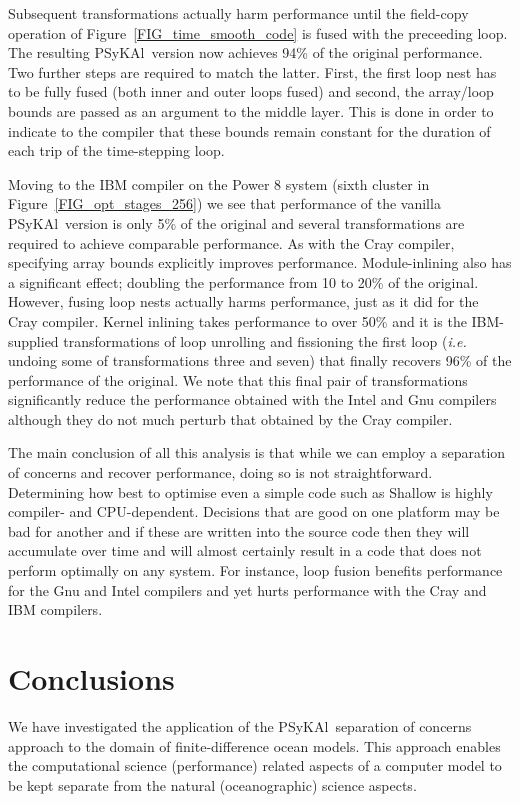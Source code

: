\documentclass{IOS-Book-Article}
\newcommand{\psykal}{{PS}y{KA}l\ }
\begin{document}
Subsequent transformations actually harm performance until the
field-copy operation of Figure~\ref{FIG_time_smooth_code} is fused
with the preceeding loop. The resulting \psykal version now achieves
94\% of the original performance. Two further steps are required to
match the latter. First, the first loop nest has to be fully fused
(both inner and outer loops fused) and second, the array/loop bounds
are passed as an argument to the middle layer. This is done in order
to indicate to the compiler that these bounds remain constant for the
duration of each trip of the time-stepping loop.

Moving to the IBM compiler on the Power 8 system (sixth cluster in
Figure~\ref{FIG_opt_stages_256}) we see that performance of the
vanilla \psykal version is only 5\% of the original and several
transformations are required to achieve comparable performance. As
with the Cray compiler, specifying array bounds explicitly improves
performance. Module-inlining also has a significant effect; doubling
the performance from 10 to 20\% of the original. However, fusing loop
nests actually harms performance, just as it did for the Cray
compiler. Kernel inlining takes performance to over 50\% and it is the
IBM-supplied transformations of loop unrolling and fissioning the
first loop ({\it i.e.} undoing some of transformations three and
seven) that finally recovers 96\% of the performance of the
original. We note that this final pair of transformations significantly
reduce the performance obtained with the Intel and Gnu compilers
although they do not much perturb that obtained by the Cray
compiler.

The main conclusion of all this analysis is that while we can employ a
separation of concerns and recover performance, doing so is not
straightforward. Determining how best to optimise even a simple code
such as Shallow is highly compiler- and CPU-dependent. Decisions that
are good on one platform may be bad for another and if these are
written into the source code then they will accumulate over time and
will almost certainly result in a code that does not perform optimally
on any system. For instance, loop fusion benefits performance for the
Gnu and Intel compilers and yet hurts performance with the Cray and
IBM compilers.

\section{Conclusions}

We have investigated the application of the \psykal separation of
concerns approach to the domain of finite-difference ocean
models. This approach enables the computational science (performance)
related aspects of a computer model to be kept separate from the
natural (oceanographic) science aspects.
\end{document}
